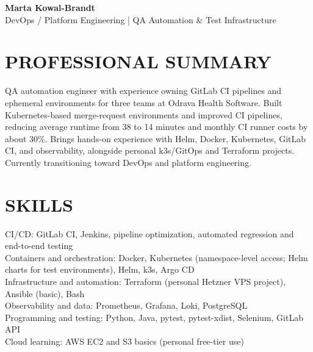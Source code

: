 \documentclass[11pt,a4paper]{article}
\begin{document}
\begin{center}
{\Huge\bfseries\color{primarycolor} Marta Kowal-Brandt}\\[0.35em]
{\large\color{accentcolor} DevOps / Platform Engineering | QA Automation & Test Infrastructure}
\end{center}
\vspace{0.4em}

\section*{PROFESSIONAL SUMMARY}
QA automation engineer with experience owning GitLab CI pipelines and ephemeral environments for three teams at Odrava Health Software. Built Kubernetes-based merge-request environments and improved CI pipelines, reducing average runtime from 38 to 14 minutes and monthly CI runner costs by about 30\%. Brings hands-on experience with Helm, Docker, Kubernetes, GitLab CI, and observability, alongside personal k3s/GitOps and Terraform projects. Currently transitioning toward DevOps and platform engineering.

\section*{SKILLS}
CI/CD: GitLab CI, Jenkins, pipeline optimization, automated regression and end-to-end testing\\
Containers and orchestration: Docker, Kubernetes (namespace-level access; Helm charts for test environments), Helm, k3s, Argo CD\\
Infrastructure and automation: Terraform (personal Hetzner VPS project), Ansible (basic), Bash\\
Observability and data: Prometheus, Grafana, Loki, PostgreSQL\\
Programming and testing: Python, Java, pytest, pytest-xdist, Selenium, GitLab API\\
Cloud learning: AWS EC2 and S3 basics (personal free-tier use)
\end{document}

